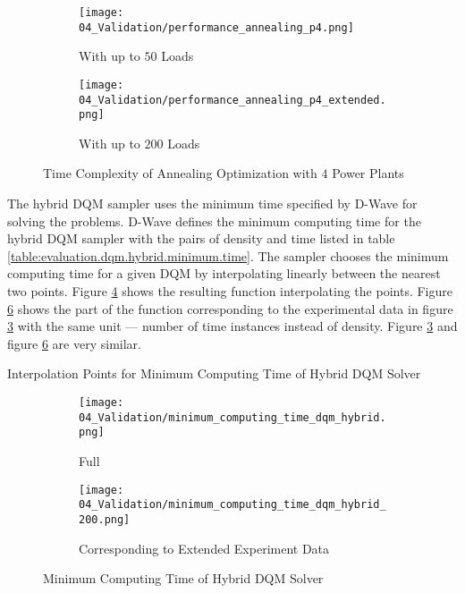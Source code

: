 \begin{figure}
  \begin{subfigure}[b]{0.5 \textwidth}
    \centering
    \texttt{[image: 04\_Validation/performance\_annealing\_p4.png]}
    \caption{With up to $50$ Loads}
    \label{figure:evaluation.annealing.performance}
  \end{subfigure}
  \begin{subfigure}[b]{0.5 \textwidth}
    \centering
    \texttt{[image: 04\_Validation/performance\_annealing\_p4\_extended.png]}
    \caption{With up to $200$ Loads}
    \label{figure:evaluation.annealing.performance.extended}
  \end{subfigure}
  \caption{Time Complexity of Annealing Optimization with $4$ Power Plants}
\end{figure}

The hybrid DQM sampler uses the minimum time specified by D-Wave for solving the problems.
D-Wave defines the minimum computing time for the hybrid DQM sampler with the pairs of density and time listed in table \ref{table:evaluation.dqm.hybrid.minimum.time}.
The sampler chooses the minimum computing time for a given DQM by interpolating linearly between the nearest two points.
Figure \ref{figure:evaluation.dqm.hybrid.minimum.time} shows the resulting function interpolating the points.
Figure \ref{figure:evaluation.dqm.hybrid.minimum.time.200} shows the part of the function corresponding to the experimental data in figure \ref{figure:evaluation.annealing.performance.extended} with the same unit --- number of time instances instead of density.
Figure \ref{figure:evaluation.annealing.performance.extended} and figure \ref{figure:evaluation.dqm.hybrid.minimum.time.200} are very similar.

\begin{table}[ht]
  \centering
  
  \caption{Interpolation Points for Minimum Computing Time of Hybrid DQM Solver}
  \label{table:evaluation.dqm.hybrid.minimum.time}
\end{table}

\begin{figure} [ht]
  \begin{subfigure}[b]{0.5 \textwidth}
    \centering
    \texttt{[image: 04\_Validation/minimum\_computing\_time\_dqm\_hybrid.png]}
    \caption{Full}
    \label{figure:evaluation.dqm.hybrid.minimum.time}
  \end{subfigure}
  \begin{subfigure}[b]{0.5 \textwidth}
    \centering
    \texttt{[image: 04\_Validation/minimum\_computing\_time\_dqm\_hybrid\_200.png]}
    \caption{Corresponding to Extended Experiment Data}
    \label{figure:evaluation.dqm.hybrid.minimum.time.200}
  \end{subfigure}
  \caption{Minimum Computing Time of Hybrid DQM Solver}
\end{figure}

